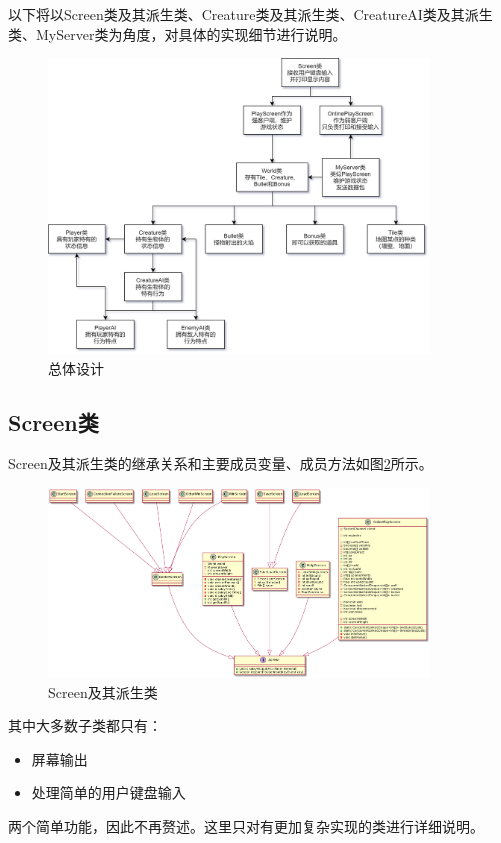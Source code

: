 \documentclass{SCIS2022cn}
\begin{document}
以下将以Screen类及其派生类、Creature类及其派生类、CreatureAI类及其派生类、MyServer类为角度，对具体的实现细节进行说明。


\begin{figure}[!t]
\centering
\includegraphics*[width=0.9\textwidth]{pics/brief.png}
\caption{总体设计}
\label{fig1}
\end{figure}

\subsection{Screen类}

Screen及其派生类的继承关系和主要成员变量、成员方法如图\ref{fig2}所示。

\begin{figure}[!t]
\centering
\includegraphics*[width=0.9\textwidth]{pics/screen.png}
\caption{Screen及其派生类}
\label{fig2}
\end{figure}

其中大多数子类都只有：
\begin{itemize}
    \item 屏幕输出
    \item 处理简单的用户键盘输入
\end{itemize}
两个简单功能，因此不再赘述。这里只对有更加复杂实现的类进行详细说明。
\end{document}
